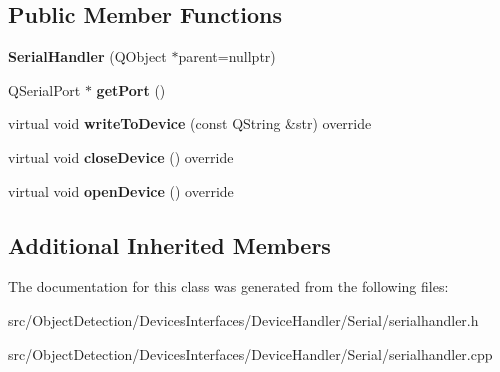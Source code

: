 \subsection*{Public Member Functions}
\begin{DoxyCompactItemize}
\item 
\mbox{\label{class_devices_1_1_serial_handler_a047b7ad42754bbfdad560af14de10285}} 
{\bfseries Serial\+Handler} (Q\+Object $\ast$parent=nullptr)
\item 
\mbox{\label{class_devices_1_1_serial_handler_aed9d868caf3a381b186632c79548c575}} 
Q\+Serial\+Port $\ast$ {\bfseries get\+Port} ()
\item 
\mbox{\label{class_devices_1_1_serial_handler_a0deffd7d3589dfae6ff08a185820c20a}} 
virtual void {\bfseries write\+To\+Device} (const Q\+String \&str) override
\item 
\mbox{\label{class_devices_1_1_serial_handler_a2d1b4bc42515a9c734cc1fa78b52c193}} 
virtual void {\bfseries close\+Device} () override
\item 
\mbox{\label{class_devices_1_1_serial_handler_a955a72ed31a63f73c9c0aea463e97386}} 
virtual void {\bfseries open\+Device} () override
\end{DoxyCompactItemize}
\subsection*{Additional Inherited Members}


The documentation for this class was generated from the following files\+:\begin{DoxyCompactItemize}
\item 
src/\+Object\+Detection/\+Devices\+Interfaces/\+Device\+Handler/\+Serial/serialhandler.\+h\item 
src/\+Object\+Detection/\+Devices\+Interfaces/\+Device\+Handler/\+Serial/serialhandler.\+cpp\end{DoxyCompactItemize}
